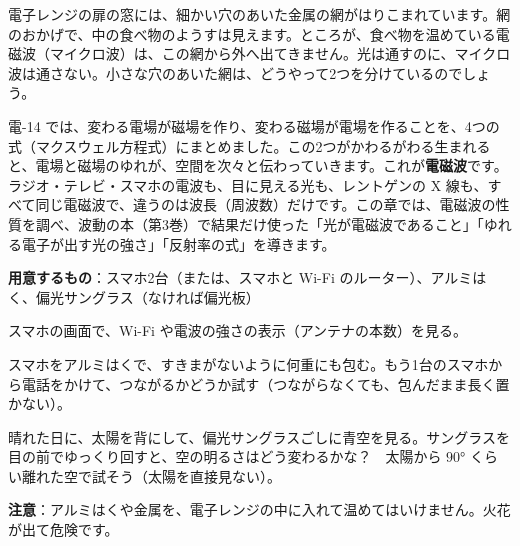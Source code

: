 \begin{hatena}
\noindent\begin{minipage}[c]{0.58\linewidth}\raggedright
電子レンジの扉の窓には、細かい穴のあいた金属の網がはりこまれています。網のおかげで、中の食べ物のようすは見えます。ところが、食べ物を温めている電磁波（マイクロ波）は、この網から外へ出てきません。光は通すのに、マイクロ波は通さない。小さな穴のあいた網は、どうやって2つを分けているのでしょう。
\end{minipage}\hfill
\begin{minipage}[c]{0.39\linewidth}\centering
{}
\end{minipage}
\end{hatena}

\noindent 電-14 では、変わる電場が磁場を作り、変わる磁場が電場を作ることを、4つの式（マクスウェル方程式）にまとめました。この2つがかわるがわる生まれると、電場と磁場のゆれが、空間を次々と伝わっていきます。これが\textbf{電磁波}です。ラジオ・テレビ・スマホの電波も、目に見える光も、レントゲンの X 線も、すべて同じ電磁波で、違うのは波長（周波数）だけです。この章では、電磁波の性質を調べ、波動の本（第3巻）で結果だけ使った「光が電磁波であること」「ゆれる電子が出す光の強さ」「反射率の式」を導きます。

\begin{yattemiyou}
\textbf{用意するもの}：スマホ2台（または、スマホと Wi-Fi のルーター）、アルミはく、偏光サングラス（なければ偏光板）
\begin{enumerate}[label={\bkcircled[bkGreen]{\arabic*}}, leftmargin=2.4\zw, itemsep=1pt, topsep=2pt]
\item スマホの画面で、Wi-Fi や電波の強さの表示（アンテナの本数）を見る。
\item スマホをアルミはくで、すきまがないように何重にも包む。もう1台のスマホから電話をかけて、つながるかどうか試す（つながらなくても、包んだまま長く置かない）。
\item 晴れた日に、太陽を背にして、偏光サングラスごしに青空を見る。サングラスを目の前でゆっくり回すと、空の明るさはどう変わるかな？　太陽から $90°$ くらい離れた空で試そう（太陽を直接見ない）。
\end{enumerate}
\textbf{注意}：アルミはくや金属を、電子レンジの中に入れて温めてはいけません。火花が出て危険です。
\end{yattemiyou}

